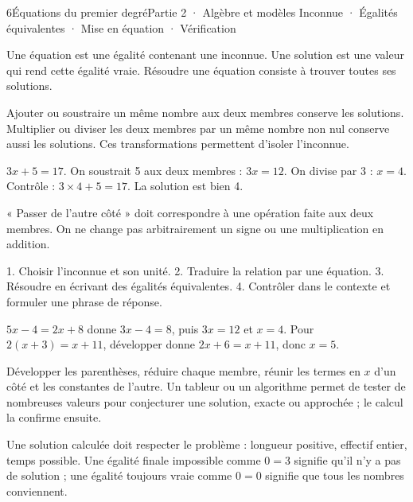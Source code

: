 \begin{ouverture}[calcul]{6}{Équations du premier degré}{Partie 2 · Algèbre et modèles}
{Inconnue · Égalités équivalentes · Mise en équation · Vérification}
\end{ouverture}
\pagestyle{otMain}\essentiel\fontsize{11}{15}\selectfont
{}\label{cours-6-1}
\begin{definition}Une équation est une égalité contenant une inconnue. Une solution est une valeur qui rend cette égalité vraie. Résoudre une équation consiste à trouver toutes ses solutions.\end{definition}
\begin{propriete}Ajouter ou soustraire un même nombre aux deux membres conserve les solutions. Multiplier ou diviser les deux membres par un même nombre non nul conserve aussi les solutions. Ces transformations permettent d’isoler l’inconnue.\end{propriete}
\begin{exemple}$3x+5=17$. On soustrait 5 aux deux membres : $3x=12$. On divise par 3 : $x=4$. Contrôle : $3\times4+5=17$. La solution est bien 4.\end{exemple}
\label{fig-cours-6-1-cours-equilibre}

\begin{attention}« Passer de l’autre côté » doit correspondre à une opération faite aux deux membres. On ne change pas arbitrairement un signe ou une multiplication en addition.\end{attention}
\clearpage
{}\label{cours-6-2}
\begin{savoirfaire}1. Choisir l’inconnue et son unité. 2. Traduire la relation par une équation. 3. Résoudre en écrivant des égalités équivalentes. 4. Contrôler dans le contexte et formuler une phrase de réponse.\end{savoirfaire}
\begin{exemple}$5x-4=2x+8$ donne $3x-4=8$, puis $3x=12$ et $x=4$. Pour $2(x+3)=x+11$, développer donne $2x+6=x+11$, donc $x=5$.\end{exemple}
\begin{savoirfaire}Développer les parenthèses, réduire chaque membre, réunir les termes en $x$ d’un côté et les constantes de l’autre. Un tableur ou un algorithme permet de tester de nombreuses valeurs pour conjecturer une solution, exacte ou approchée ; le calcul la confirme ensuite.\end{savoirfaire}
\begin{attention}Une solution calculée doit respecter le problème : longueur positive, effectif entier, temps possible. Une égalité finale impossible comme $0=3$ signifie qu’il n’y a pas de solution ; une égalité toujours vraie comme $0=0$ signifie que tous les nombres conviennent.\end{attention}

